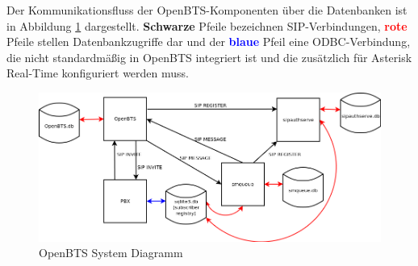 Der Kommunikationsfluss der OpenBTS-Komponenten über die Datenbanken ist in Abbildung \ref{fig:openbts_system_diagram} dargestellt. \textbf{Schwarze} Pfeile bezeichnen SIP-Verbindungen, \textcolor{red}{\textbf{rote}} Pfeile stellen Datenbankzugriffe dar und der \textcolor{blue}{\textbf{blaue}} Pfeil eine ODBC-Verbindung, die nicht standardmäßig in OpenBTS integriert ist und die zusätzlich für Asterisk Real-Time konfiguriert werden muss.
\begin{figure}[htbp]
	\centering
		\includegraphics[width=1.00\textwidth]{includes/openbts_system_diagram}
	\caption{OpenBTS System Diagramm}
	\label{fig:openbts_system_diagram}
\end{figure}




\newpage
\subsection{}